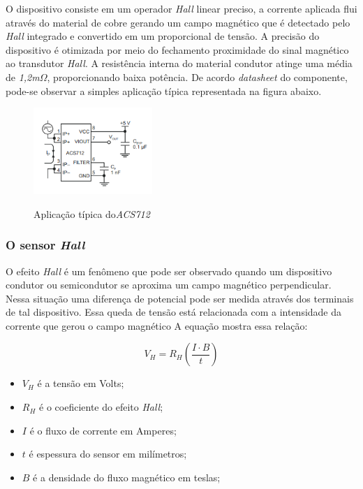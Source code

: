 O dispositivo consiste em um operador \textit{Hall} linear preciso, a corrente aplicada flui através do material de cobre gerando um campo magnético que é detectado pelo \textit{Hall} integrado e convertido em um proporcional de tensão. A precisão do dispositivo é otimizada por meio do fechamento proximidade do sinal magnético ao transdutor \textit{Hall}. A resistência interna do material condutor atinge uma média de \textit{1,2m}$\Omega$, proporcionando baixa potência. De acordo \textit{datasheet} do componente, pode-se observar a simples aplicação típica representada na figura abaixo.
 
\begin{figure}[H]
	\centering
	\caption{Aplicação típica do\textit{ACS712}}
	\includegraphics[width=0.4\textwidth]{figuras/ACS712_typical.png}
	\label{fig:acs712_typical}
\end{figure} 

\subsubsection{O sensor \textit{Hall}}

O efeito \textit{Hall} é um fenômeno que pode ser observado quando um dispositivo condutor ou semicondutor se aproxima um campo magnético perpendicular. Nessa situação uma diferença de potencial pode ser medida através dos terminais de tal dispositivo. Essa queda de tensão está relacionada com a intensidade da corrente que gerou o campo magnético \cite{ElectronicsTutorials} A equação mostra essa relação: 

\begin{equation}
V_H = R_H\left ( \frac{I\cdot B}{t} \right)
\end{equation}

\begin{itemize}
	
	\item $V_H$ é a tensão em Volts;
	\item $R_H$ é o coeficiente do efeito \textit{Hall};
	\item  $I$ é o fluxo de corrente em Amperes;
	\item $t$ é espessura do sensor em milímetros;
	\item $B$ é a densidade do fluxo magnético em teslas; \ \\
\end{itemize}

